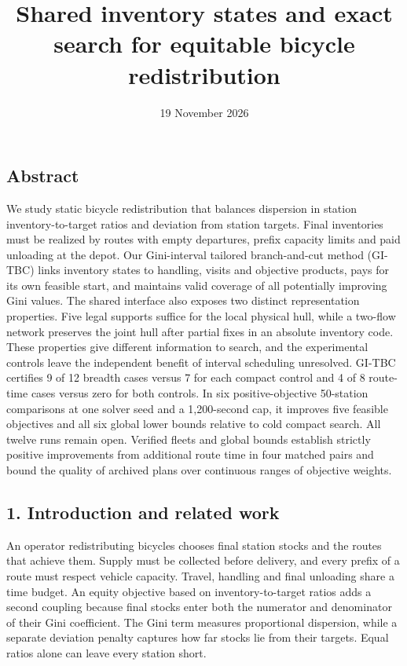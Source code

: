 \documentclass[
  american,
  11pt,
]{article}
\title{Shared inventory states and exact search for equitable bicycle
redistribution}
\author{}
\date{19 November 2026}
\begin{document}
\maketitle

{
\setcounter{tocdepth}{2}
\tableofcontents
}
\subsection{Abstract}\label{abstract}

We study static bicycle redistribution that balances dispersion in
station inventory-to-target ratios and deviation from station targets.
Final inventories must be realized by routes with empty departures,
prefix capacity limits and paid unloading at the depot. Our
Gini-interval tailored branch-and-cut method (GI-TBC) links inventory
states to handling, visits and objective products, pays for its own
feasible start, and maintains valid coverage of all potentially
improving Gini values. The shared interface also exposes two distinct
representation properties. Five legal supports suffice for the local
physical hull, while a two-flow network preserves the joint hull after
partial fixes in an absolute inventory code. These properties give
different information to search, and the experimental controls leave the
independent benefit of interval scheduling unresolved. GI-TBC certifies
9 of 12 breadth cases versus 7 for each compact control and 4 of 8
route-time cases versus zero for both controls. In six
positive-objective 50-station comparisons at one solver seed and a
1,200-second cap, it improves five feasible objectives and all six
global lower bounds relative to cold compact search. All twelve runs
remain open. Verified fleets and global bounds establish strictly
positive improvements from additional route time in four matched pairs
and bound the quality of archived plans over continuous ranges of
objective weights.

\subsection{1. Introduction and related
work}\label{introduction-and-related-work}

An operator redistributing bicycles chooses final station stocks and the
routes that achieve them. Supply must be collected before delivery, and
every prefix of a route must respect vehicle capacity. Travel, handling
and final unloading share a time budget. An equity objective based on
inventory-to-target ratios adds a second coupling because final stocks
enter both the numerator and denominator of their Gini coefficient. The
Gini term measures proportional dispersion, while a separate deviation
penalty captures how far stocks lie from their targets. Equal ratios
alone can leave every station short.
\end{document}

